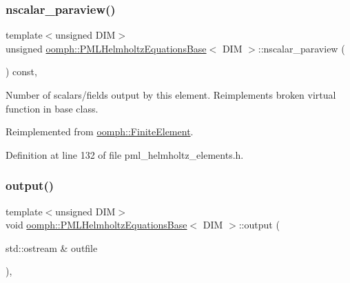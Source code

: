 \subsubsection{\texorpdfstring{nscalar\+\_\+paraview()}{nscalar\_paraview()}}
{\footnotesize\ttfamily template$<$unsigned D\+IM$>$ \\
unsigned \hyperlink{classoomph_1_1PMLHelmholtzEquationsBase}{oomph\+::\+P\+M\+L\+Helmholtz\+Equations\+Base}$<$ D\+IM $>$\+::nscalar\+\_\+paraview (\begin{DoxyParamCaption}{ }\end{DoxyParamCaption}) const\hspace{0.3cm}{\ttfamily [inline]}, {\ttfamily [virtual]}}



Number of scalars/fields output by this element. Reimplements broken virtual function in base class. 



Reimplemented from \hyperlink{classoomph_1_1FiniteElement_a865e2e5586552ba80babdbe26a77fe8c}{oomph\+::\+Finite\+Element}.



Definition at line 132 of file pml\+\_\+helmholtz\+\_\+elements.\+h.

\mbox{\label{classoomph_1_1PMLHelmholtzEquationsBase_ad13677aed8be5a42b31a1f8d4f520d35}} 
\subsubsection{\texorpdfstring{output()}{output()}\hspace{0.1cm}{\footnotesize\ttfamily [1/4]}}
{\footnotesize\ttfamily template$<$unsigned D\+IM$>$ \\
void \hyperlink{classoomph_1_1PMLHelmholtzEquationsBase}{oomph\+::\+P\+M\+L\+Helmholtz\+Equations\+Base}$<$ D\+IM $>$\+::output (\begin{DoxyParamCaption}\item[{std\+::ostream \&}]{outfile }\end{DoxyParamCaption})\hspace{0.3cm}{\ttfamily [inline]}, {\ttfamily [virtual]}}



